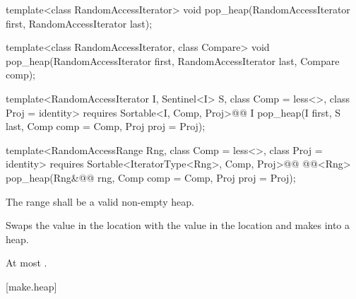 %
\begin{removedblock}
\begin{itemdecl}
template<class RandomAccessIterator>
  void pop_heap(RandomAccessIterator first, RandomAccessIterator last);

template<class RandomAccessIterator, class Compare>
  void pop_heap(RandomAccessIterator first, RandomAccessIterator last,
                Compare comp);
\end{itemdecl}
\end{removedblock}
\begin{addedblock}
\begin{itemdecl}
template<RandomAccessIterator I, Sentinel<I> S, class Comp = less<>,
    class Proj = identity>
  requires Sortable<I, Comp, Proj>@\newtxt{()}@
  I pop_heap(I first, S last, Comp comp = Comp{}, Proj proj = Proj{});

template<RandomAccessRange Rng, class Comp = less<>, class Proj = identity>
  requires Sortable<IteratorType<Rng>, Comp, Proj>@\newtxt{()}@
  @@<Rng>
    pop_heap(Rng&@\newtxt{\&}@ rng, Comp comp = Comp{}, Proj proj = Proj{});
\end{itemdecl}
\end{addedblock}

\begin{itemdescr}
\pnum
\requires
The range
shall be a valid non-empty heap.

\pnum
\effects
Swaps the value in the location 
with the value in the location
and makes
into a heap.

\begin{addedblock}
\pnum
\returns {}
\end{addedblock}

\pnum
\complexity
At most
.
\end{itemdescr}

[make.heap]{}

